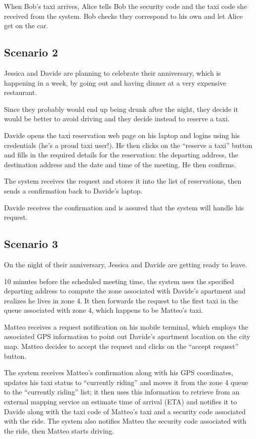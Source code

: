 When Bob's taxi arrives, Alice tells Bob the security code and the taxi code she received from the system. Bob checks they correspond to his own and let Alice get on the car.


\subsection{Scenario 2}
Jessica and Davide are planning to celebrate their anniversary, which is happening in a week, by going out and having dinner at a very expensive restaurant.

Since they probably would end up being drunk after the night, they decide it would be better to avoid driving and they decide instead to reserve a taxi.

Davide opens the taxi reservation web page on his laptop and logins using his credentials (he's a proud taxi user!). He then clicks on the ``reserve a taxi'' button and fills in the required details for the reservation: the departing address, the destination address and the date and time of the meeting. He then confirms.

The system receives the request and stores it into the list of reservations, then sends a confirmation back to Davide's laptop.

Davide receives the confirmation and is assured that the system will handle his request.


\subsection{Scenario 3}
On the night of their anniversary, Jessica and Davide are getting ready to leave.

10 minutes before the scheduled meeting time, the system uses the specified departing address to compute the zone associated with Davide's apartment and realizes he lives in zone 4. It then forwards the request to the first taxi in the queue associated with zone 4, which happens to be Matteo's taxi.

Matteo receives a request notification on his mobile terminal, which employs the associated GPS information to point out Davide's apartment location on the city map. Matteo decides to accept the request and clicks on the ``accept request'' button.

The system receives Matteo's confirmation along with his GPS coordinates, updates his taxi status to ``currently riding'' and moves it from the zone 4 queue to the ``currently riding'' list; it then uses this information to retrieve from an external mapping service an estimate time of arrival (ETA) and notifies it to Davide along with the taxi code of Matteo's taxi and a security code associated with the ride. The system also notifies Matteo the security code associated with the ride, then Matteo starts driving.

